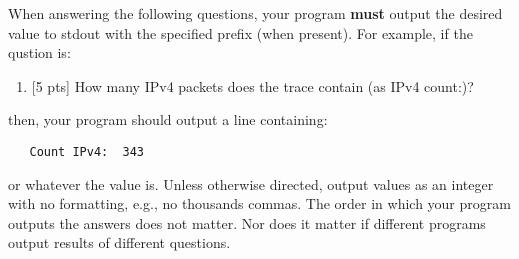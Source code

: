 When answering the following questions, your program \textbf{must} output the desired value to stdout with the specified prefix
(when present).
For example, if the qustion is:
\begin{enumerate}
\item {[5 pts]} How many IPv4 packets does the trace contain (as IPv4 count:)?
\end{enumerate}
\noindent then, your program should output a line  containing:
\begin{verbatim}
   Count IPv4:  343
\end{verbatim}
\noindent or whatever the value is.  Unless otherwise directed, output values as 
an integer with no formatting, e.g., no thousands commas.  
The order in which your program outputs the answers does not matter.  Nor does it matter
if different programs output results of different questions.

